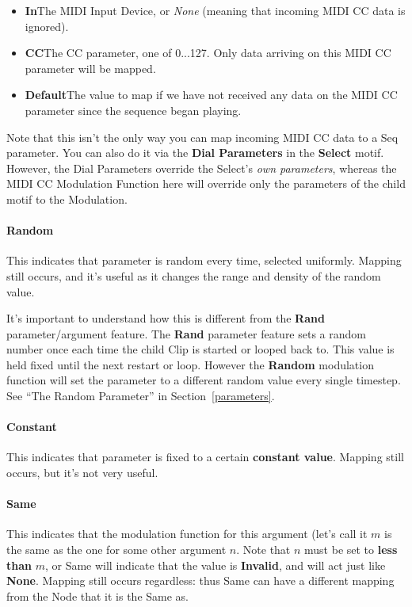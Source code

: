 \documentclass[twoside,10pt]{article}
\begin{document}
\begin{itemize}
\item {\bf In}\qquad The MIDI Input Device, or {\it None} (meaning that incoming MIDI CC data is ignored). 
\item {\bf CC}\qquad The CC parameter, one of 0...127.  Only data arriving on this MIDI CC parameter will be mapped.
\item {\bf Default}\qquad The value to map if we have not received any data on the MIDI CC parameter since the sequence began playing.
\end{itemize}

Note that this isn't the only way you can map incoming MIDI CC data to a Seq parameter.  You can also do it via the {\bf Dial Parameters} in the {\bf Select} motif.  However, the Dial Parameters override the Select's {\it own parameters}, whereas the MIDI CC Modulation Function here will override only the parameters of the child motif to the Modulation.

\paragraph{Random}

This indicates that parameter is random every time, selected uniformly.  Mapping still occurs, and it's useful as it changes the range and density of the random value.  

It's important to understand how this is different from the {\bf Rand} parameter/argument feature.  The {\bf Rand} parameter feature sets a random number once each time the child Clip is started or looped back to.  This value is held fixed until the next restart or loop.  However the {\bf Random} modulation function will set the parameter to a different random value every single timestep.  See ``The Random Parameter'' in Section~\ref{parameters}.

\paragraph{Constant}

This indicates that parameter is fixed to a certain {\bf constant value}.  Mapping still occurs, but it's not very useful.

\paragraph{Same}

This indicates that the modulation function for this argument (let's call it \(m\) is the same as the one for some other argument \(n\). Note that \(n\) must be set to {\bf less than} \(m\), or Same will indicate that the value is {\bf Invalid}, and will act just like {\bf None}.  Mapping still occurs regardless: thus Same can have a different mapping from the Node that it is the Same as.
\end{document}
